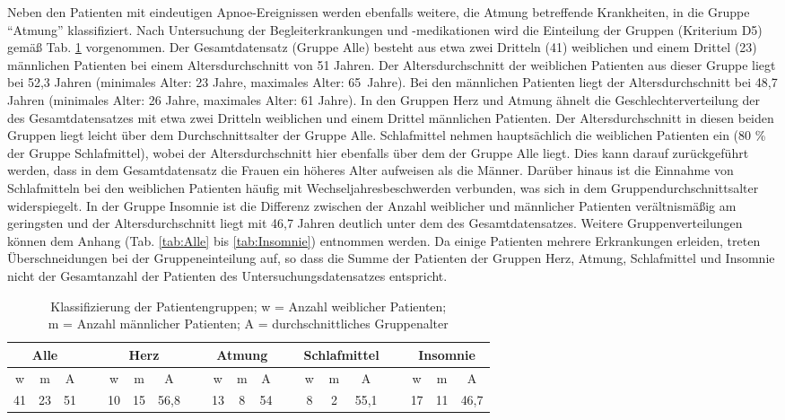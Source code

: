 Neben den Patienten mit eindeutigen Apnoe-Ereignissen werden ebenfalls weitere, die Atmung betreffende Krankheiten, in die Gruppe "`Atmung"' klassifiziert. Nach Untersuchung der Begleiterkrankungen und -medikationen wird die Einteilung der Gruppen (Kriterium D5) gemäß Tab. \ref{tab:gruppen} vorgenommen. Der Gesamtdatensatz (Gruppe Alle) besteht aus etwa zwei Dritteln (41) weiblichen und einem Drittel (23) männlichen Patienten bei einem Altersdurchschnitt von 51 Jahren. Der Altersdurchschnitt der weiblichen Patienten aus dieser Gruppe liegt bei 52,3 Jahren (minimales Alter: 23 Jahre, maximales Alter: 65~Jahre). Bei den männlichen Patienten liegt der Altersdurchschnitt bei 48,7 Jahren (minimales Alter: 26 Jahre, maximales Alter: 61 Jahre). In den Gruppen Herz und Atmung ähnelt die Geschlechterverteilung der des Gesamtdatensatzes mit etwa zwei Dritteln weiblichen und einem Drittel männlichen Patienten. Der Altersdurchschnitt in diesen beiden Gruppen liegt leicht über dem Durchschnittsalter der Gruppe Alle. Schlafmittel nehmen hauptsächlich die weiblichen Patienten ein (80 \% der Gruppe Schlafmittel), wobei der Altersdurchschnitt hier ebenfalls über dem der Gruppe Alle liegt. Dies kann darauf zurückgeführt werden, dass in dem Gesamtdatensatz die Frauen ein höheres Alter aufweisen als die Männer. Darüber hinaus ist die Einnahme von Schlafmitteln bei den weiblichen Patienten häufig mit Wechseljahresbeschwerden verbunden, was sich in dem Gruppendurchschnittsalter widerspiegelt. In der Gruppe Insomnie ist die Differenz zwischen der Anzahl weiblicher und männlicher Patienten verältnismäßig am geringsten und der Altersdurchschnitt liegt mit 46,7 Jahren deutlich unter dem des Gesamtdatensatzes. Weitere Gruppenverteilungen können dem Anhang (Tab. \ref{tab:Alle} bis \ref{tab:Insomnie}) entnommen werden. Da einige Patienten mehrere Erkrankungen erleiden, treten Überschneidungen bei der Gruppeneinteilung auf, so dass die Summe der Patienten der Gruppen Herz, Atmung, Schlafmittel und Insomnie nicht der Gesamtanzahl der Patienten des Untersuchungsdatensatzes entspricht.\\

\begin{table}[H] 
\centering
\begin{tabularx}{\textwidth}{ccccccccccccccccccc}
\toprule
\multicolumn{3}{c}{\textbf{Alle}} & &  \multicolumn{3}{c}{\textbf{Herz}} & &  \multicolumn{3}{c}{\textbf{Atmung}} & &  \multicolumn{3}{c}{\textbf{Schlafmittel}} & &  \multicolumn{3}{c}{\textbf{Insomnie}}\\  
\midrule
w  & m  & A  &   & w  & m  & A    &   & w  & m & A  &   & w & m & A    &   & w  & m  & A\\
41 & 23 & 51 & ~ & 10 & 15 & 56,8 & ~ & 13 & 8 & 54 & ~ & 8 & 2 & 55,1 & ~ & 17 & 11 & 46,7\\
\bottomrule
\end{tabularx}
\caption[Klassifizierung der Patientengruppen]{Klassifizierung der Patientengruppen; w = Anzahl weiblicher Patienten;\\m = Anzahl männlicher Patienten; A = durchschnittliches Gruppenalter}
\label{tab:gruppen}
\end{table}


